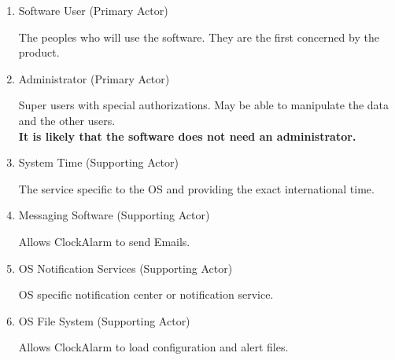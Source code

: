 \begin{enumerate}
	\item Software User (Primary Actor)
	\par The peoples who will  use the software. They are the first concerned  by the product.
	\item Administrator (Primary Actor)
	\par Super users with special authorizations. May be able to manipulate the data and the other users.
	\\ \textbf{It is likely that the software does not need an administrator.}
	\item System Time (Supporting Actor)
	\par The service specific to the OS and providing the exact international time.
	\item Messaging Software (Supporting Actor)
	\par Allows ClockAlarm to send Emails.
	\item OS Notification Services (Supporting Actor)
	\par OS specific notification center or notification service.
    \item OS File System (Supporting Actor)
    \par Allows ClockAlarm to load configuration and alert files.
\end{enumerate}
